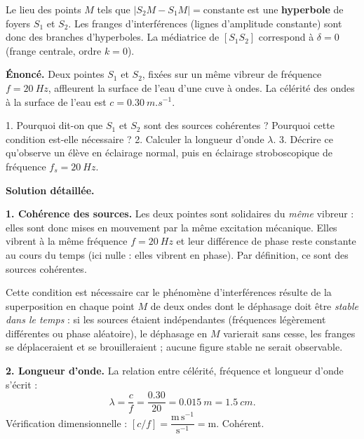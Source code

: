 \documentclass[11pt]{article}
\newcommand{\cle}[1]{{\popxbold\color{popdark}#1}}
\begin{document}
\begin{propriete}
Le lieu des points $M$ tels que $|S_2M - S_1M| = \text{constante}$ est une \textbf{hyperbole} de foyers $S_1$ et $S_2$. Les franges d'interférences (lignes d'amplitude constante) sont donc des branches d'hyperboles. La médiatrice de $[S_1S_2]$ correspond à $\delta = 0$ (frange centrale, ordre $k=0$).
\end{propriete}

\begin{exoresolu}
\textbf{Énoncé.} Deux pointes $S_1$ et $S_2$, fixées sur un même vibreur de fréquence $f = \SI{20}{Hz}$, affleurent la surface de l'eau d'une cuve à ondes. La célérité des ondes à la surface de l'eau est $c = \SI{0,30}{m.s^{-1}}$.

1. Pourquoi dit-on que $S_1$ et $S_2$ sont des sources cohérentes ? Pourquoi cette condition est-elle nécessaire ?
2. Calculer la longueur d'onde $\lambda$.
3. Décrire ce qu'observe un élève en éclairage normal, puis en éclairage stroboscopique de fréquence $f_s = \SI{20}{Hz}$.

\tcblower
\textbf{Solution détaillée.}

\textbf{1. Cohérence des sources.} Les deux pointes sont solidaires du \emph{même} vibreur : elles sont donc mises en mouvement par la même excitation mécanique. Elles vibrent à la même fréquence $f = \SI{20}{Hz}$ et leur différence de phase reste constante au cours du temps (ici nulle : elles vibrent en phase). Par définition, ce sont des \cle{sources cohérentes}.

Cette condition est nécessaire car le phénomène d'interférences résulte de la superposition en chaque point $M$ de deux ondes dont le déphasage doit être \emph{stable dans le temps} : si les sources étaient indépendantes (fréquences légèrement différentes ou phase aléatoire), le déphasage en $M$ varierait sans cesse, les franges se déplaceraient et se brouilleraient ; aucune figure stable ne serait observable.

\textbf{2. Longueur d'onde.} La relation entre célérité, fréquence et longueur d'onde s'écrit :
\[ \lambda = \frac{c}{f} = \frac{\num{0,30}}{20} = \SI{0,015}{m} = \SI{1,5}{cm}. \]
Vérification dimensionnelle : $[c/f] = \dfrac{\mathrm{m\,s^{-1}}}{\mathrm{s^{-1}}} = \mathrm{m}$. Cohérent.


\end{exoresolu}
\end{document}
